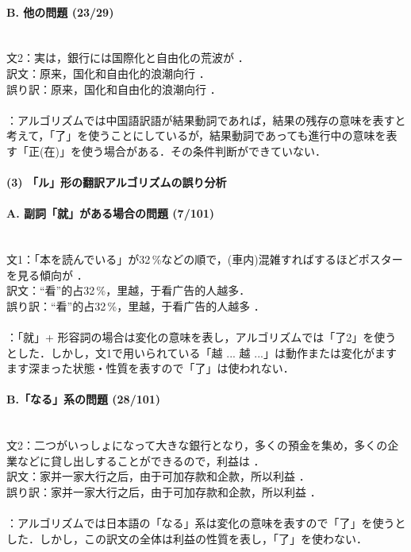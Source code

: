 \paragraph{B. 他の問題 (23/29)}　\\
文2：実は，銀行には国際化と自由化の荒波が ．\\
訳文：原来，国化和自由化的浪潮向行 ．\\
誤り訳：原来，国化和自由化的浪潮向行 ．\\
\\
：アルゴリズムでは中国語訳語が結果動詞であれば，結果の残存の意味を表すと考えて，「了」を使うことにしているが，結果動詞であっても進行中の意味を表す「正(在)」を使う場合がある．その条件判断ができていない．

\paragraph{(3) 「ル」形の翻訳アルゴリズムの誤り分析}
\paragraph{A. 副詞「就」がある場合の問題 (7/101)}　\\
文1：「本を読んでいる」が32\,\%などの順で，(車内)混雑すればするほどポスターを見る傾向が ．\\
訳文：``看''的占32\,\%，里越，于看广告的人越多．\\
誤り訳：``看''的占32\,\%，里越，于看广告的人越多 ．\\
\\
：「就」+ 形容詞の場合は変化の意味を表し，アルゴリズムでは「了2」を使うとした．しかし，文1で用いられている「越 ... 越 ...」は動作または変化がますます深まった状態・性質を表すので「了」は使われない．

\paragraph{B.「なる」系の問題 (28/101)}　\\
文2：二つがいっしょになって大きな銀行となり，多くの預金を集め，多くの企業などに貸し出しすることができるので，利益は ．\\
訳文：家并一家大行之后，由于可加存款和企款，所以利益 ．\\
誤り訳：家并一家大行之后，由于可加存款和企款，所以利益 ．\\
\\
：アルゴリズムでは日本語の「なる」系は変化の意味を表すので「了」を使うとした．しかし，この訳文の全体は利益の性質を表し，「了」を使わない．

